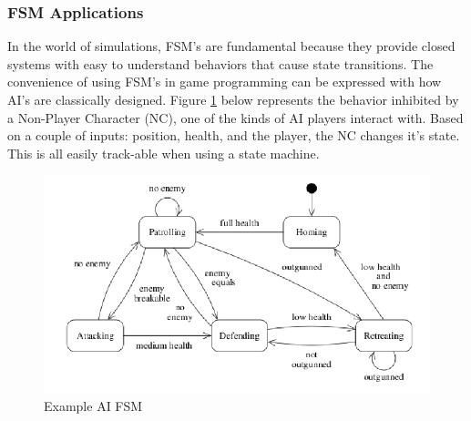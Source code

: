 \subsubsection{FSM Applications}
In the world of simulations, FSM's are fundamental because they provide closed systems with easy to understand behaviors that cause state transitions. The convenience of using FSM's in game programming can be expressed with how AI's are classically designed. Figure \ref{fig:soldier_fsm} below represents the behavior inhibited by a Non-Player Character (NC), one of the kinds of AI players interact with. Based on a couple of inputs: position, health, and the player, the NC changes it's state. This is all easily track-able when using a state machine.

\begin{figure}[H]
    \centering
    \includegraphics[width=0.8\linewidth]{resources/soldier_fsm.png}
    \caption{Example AI FSM \cite{FSM}}
    \label{fig:soldier_fsm}
\end{figure}
